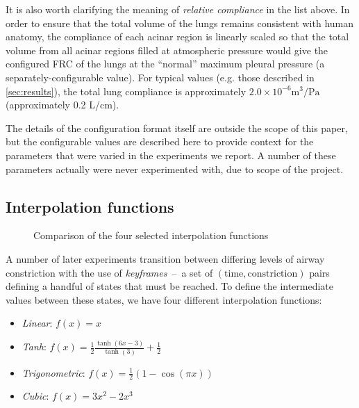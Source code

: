 \breakpars

It is also worth clarifying the meaning of \textit{relative compliance} in the list above. In order
to ensure that the total volume of the lungs remains consistent with human anatomy, the compliance
of each acinar region is linearly scaled so that the total volume from all acinar regions filled at
atmospheric pressure would give the configured FRC of the lungs at the ``normal'' maximum pleural
pressure (a separately-configurable value). For typical values (e.g. those described in
\autoref{sec:results}), the total lung compliance is approximately $2.0 \times 10^{-6}
\text{m}^3/\text{Pa}$ (approximately 0.2 L/cm).

\breakpars

The details of the configuration format itself are outside the scope of this paper, but the
configurable values are described here to provide context for the parameters that were varied in the
experiments we report. A number of these parameters actually were never experimented with, due to
scope of the project.

\subsection{Interpolation functions} \label{sec:interpolation}

\begin{figure}[ht!]
    \centering
    \begin{tikzpicture}
        
    \end{tikzpicture}
    \caption{Comparison of the four selected interpolation functions}
    \label{fig:interpolate-functions}
\end{figure}

A number of later experiments transition between differing levels of airway constriction with the
use of \textit{keyframes}~--~a set of $(\text{time}, \text{constriction})$ pairs defining a handful
of states that must be reached. To define the intermediate values between these states, we have four
different interpolation functions:

\begin{itemize}
    \item \textit{Linear}: $f(x) = x$
    \item \textit{Tanh}: $f(x) = \frac{1}{2} \frac{\tanh(6x - 3)}{\tanh(3)} + \frac{1}{2}$
    \item \textit{Trigonometric}: $f(x) = \frac{1}{2} (1 - \cos(\pi x))$
    \item \textit{Cubic}: $f(x) = 3x^2 - 2x^3$
\end{itemize}

